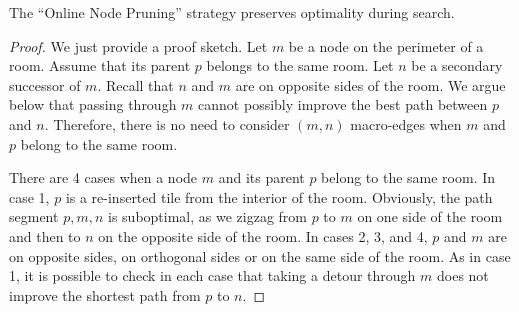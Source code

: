 \begin{lemma}
The ``Online Node Pruning'' strategy preserves optimality during search.
\end{lemma}
\begin{proof}
We just provide a proof sketch. 
Let $m$ be a node on the perimeter of a room. Assume that its parent $p$ belongs
to the same room.
Let $n$ be a secondary successor of $m$.
Recall that $n$ and $m$ are on opposite sides of the room.
We argue below that passing through $m$ cannot possibly improve the 
best path between $p$ and $n$.
Therefore, there is no need to consider $(m,n)$ macro-edges
when $m$ and $p$ belong to the same room.

There are 4 cases when a node $m$ and its parent $p$ belong to the
same room. In case 1, $p$ is a re-inserted tile from the interior of the room. 
Obviously, the path segment $p,m,n$ is suboptimal, as we zigzag from $p$ to $m$
on one side of the room and then to $n$ on the opposite
side of the room.
In cases 2, 3, and 4, $p$ and $m$ are on opposite sides, on orthogonal sides or 
on the same side of the room. As in case 1, it is possible to check in each case that
taking a detour through $m$ does not improve the shortest path from $p$ to $n$.
\end{proof}




